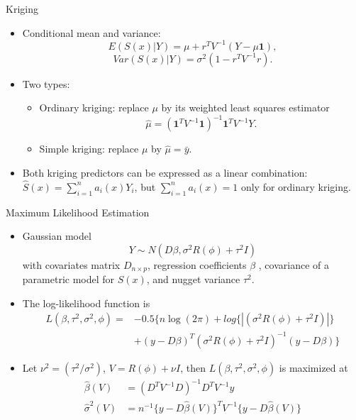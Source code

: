 \documentclass{beamer}
\begin{document}
\begin{frame}{Kriging}
	\begin{itemize}
		
		\item Conditional mean and variance:
		$$E(S(x) | Y) = \mu + r^T V^{-1}(Y - \mu \mathbf{1}),$$
		$$Var(S(x) | Y) = \sigma^2 (1 - r^T V^{-1} r).$$
		
		\item Two types:
		\begin{itemize} 
			\item Ordinary kriging: replace $\mu$ by its weighted least squares estimator
			$$\hat{\mu} = (\mathbf{1}^T V^{-1} \mathbf{1})^{-1} \mathbf{1}^T V^{-1} Y.$$
			
			\item Simple kriging: replace $\mu$ by $\hat{\mu} = \bar{y}$.
		\end{itemize}
		
		
		
		\item Both kriging predictors can be expressed as a linear combination: $\hat{S}(x) = \sum_{i=1}^{n}a_i(x) Y_i$, but $\sum_{i=1}^{n}a_i(x)=1$ only for ordinary kriging.
	\end{itemize}
\end{frame}

\begin{frame}{Maximum Likelihood Estimation}
	\begin{itemize}
		\item Gaussian model
		$$Y \sim N(D\beta, \sigma^2 R(\phi) + \tau^2I) $$
		with covariates matrix $D_{n\times p}$, regression coefficients $\beta$ ,  covariance of a parametric model for $S(x)$, and nugget variance $\tau^2$. 
		\item The log-likelihood function is 
		\begin{align*}
		L(\beta, \tau^2, \sigma^2, \phi) =  &- 0.5 \{n \log(2\pi) + log\{|(\sigma^2 R(\phi) +\tau^2 I) | \} \\
		&+ (y-D\beta)^T(\sigma^2 R(\phi) + \tau^2 I)^{-1} (y - D\beta)\}
		\end{align*}
		\item Let $\nu^2 = ({\tau^2} /{\sigma^2})$, $V = R(\phi) + \nu I$, then $L(\beta, \tau^2, \sigma^2, \phi)$ is maximized at 
		\begin{align}
		\hat{\beta}(V) &= (D^T V^{-1}D)^{-1}D^TV^{-1}y \\
		\hat{\sigma}^2(V) &= n^{-1} \{y - D\hat{\beta}(V)\}^T V^{-1}\{y - D\hat{\beta}(V)\} 
		\end{align}
	\end{itemize}
\end{frame}
\end{document}

